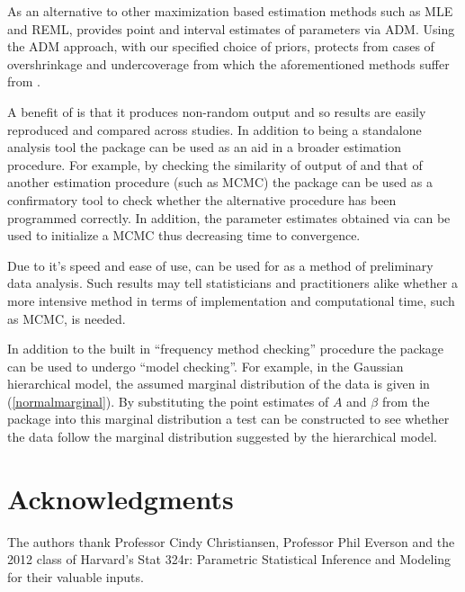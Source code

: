 \documentclass[article]{jss}
\begin{document}
As an alternative to other maximization based estimation methods such as MLE and REML,  provides point and interval estimates of parameters via ADM. Using the ADM approach, with our specified choice of priors, protects from cases of overshrinkage and undercoverage from which the aforementioned methods suffer from \citep{accuracy1988}.


A benefit of  is that it produces non-random output and so results are easily reproduced and compared across studies. In addition to being a standalone analysis tool the package can be used as an aid in a broader estimation procedure. For example, by checking the similarity of output of  and that of another estimation procedure (such as MCMC) the package can be used as a confirmatory tool to check whether the alternative procedure has been programmed correctly. In addition, the parameter estimates obtained via  can be used to initialize a MCMC thus decreasing time to convergence. %

Due to it's speed and ease of use,  can be used for as a method of preliminary data analysis. Such results may tell statisticians and practitioners alike whether a more intensive method in terms of implementation and computational time, such as MCMC, is needed. 


In addition to the built in ``frequency method checking'' procedure the package can be used to undergo ``model checking''. For example, in the Gaussian hierarchical model, the assumed marginal distribution of the data is given in (\ref{normalmarginal}). By substituting the point estimates of $A$ and $\beta$ from the package into this marginal distribution a test can be constructed to see whether the data follow the marginal distribution suggested by the hierarchical model.


\section[acknowledgments]{Acknowledgments}
The authors thank Professor Cindy Christiansen, Professor Phil Everson and the 2012 class of Harvard's Stat 324r: Parametric Statistical Inference and Modeling for their valuable inputs.


\end{document}
